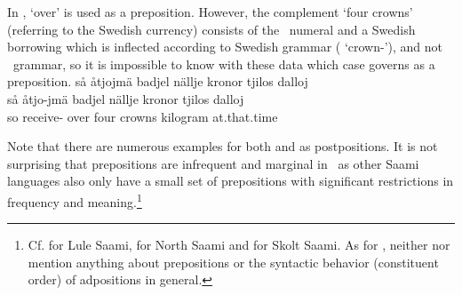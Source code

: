 In ,  ‘over’ is used as a preposition. %
However, the complement  ‘four crowns’ (referring to the Swedish currency) consists of the \PS\ numeral  and a Swedish borrowing  which is inflected according to Swedish grammar ( ‘crown-\PLs’), and not \PS\ grammar, so it is impossible to know with these data which case  governs as a preposition. 
\ea\label{prepositionEx2}%
\glll	så åtjojmä badjel nällje kronor tjilos dalloj\\
	så åtjo-jmä badjel nällje kronor tjilos dalloj\\
	so receive- over four crowns kilogram at.that.time\\\nopagebreak
{}	
\z

Note that there are numerous examples for both  and  as postpositions. 
It is not surprising that prepositions are infrequent and marginal in \PS\ as other Saami languages also only have a small set of prepositions with significant restrictions in frequency and meaning.\footnote{Cf. \citet[91-92]{Spiik1989} for Lule Saami, \citet[84-85]{Svonni2009} for North Saami and \citet[314-317]{Feist2010} for Skolt Saami. As for \PS, neither \citet{Lagercrantz1926} nor \citet{Lehtiranta1992} mention anything about prepositions or the syntactic behavior (constituent order) of adpositions in general.} %





